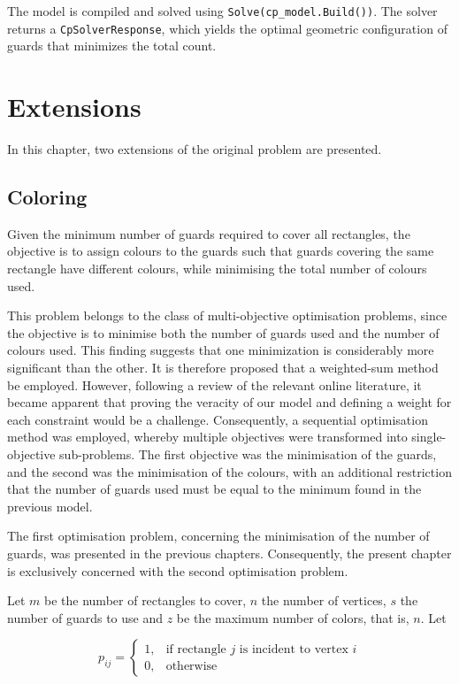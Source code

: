 \documentclass{report}
\begin{document}
The model is compiled and solved using \texttt{Solve(cp\_model.Build())}. The solver returns a \texttt{CpSolverResponse}, which yields the optimal geometric configuration of guards that minimizes the total count.

\chapter{Extensions}
In this chapter, two extensions of the original problem are presented. 

\section{Coloring}
Given the minimum number of guards required to cover all rectangles, the objective is to assign colours to the guards such that guards covering the same rectangle have different colours, while minimising the total number of colours used.

This problem belongs to the class of multi-objective optimisation problems, since the objective is to minimise both the number of guards used and the number of colours used. This finding suggests that one minimization is considerably more significant than the other. It is therefore proposed that a weighted-sum method be employed. However, following a review of the relevant online literature, it became apparent that proving the veracity of our model and defining a weight for each constraint would be a challenge. Consequently, a sequential optimisation method was employed, whereby multiple objectives were transformed into single-objective sub-problems. The first objective was the minimisation of the guards, and the second was the minimisation of the colours, with an additional restriction that the number of guards used must be equal to the minimum found in the previous model. 

The first optimisation problem, concerning the minimisation of the number of guards, was presented in the previous chapters. Consequently, the present chapter is exclusively concerned with the second optimisation problem.

Let $m$ be the number of rectangles to cover, $n$ the number of vertices, $s$ the number of guards to use and $z$ be the maximum number of colors, that is, $n$. Let

$$
p_{ij} =
\begin{cases}
1, & \text{if rectangle } j \text{ is incident to vertex } i \\
0, & \text{otherwise}
\end{cases}
$$
\end{document}
